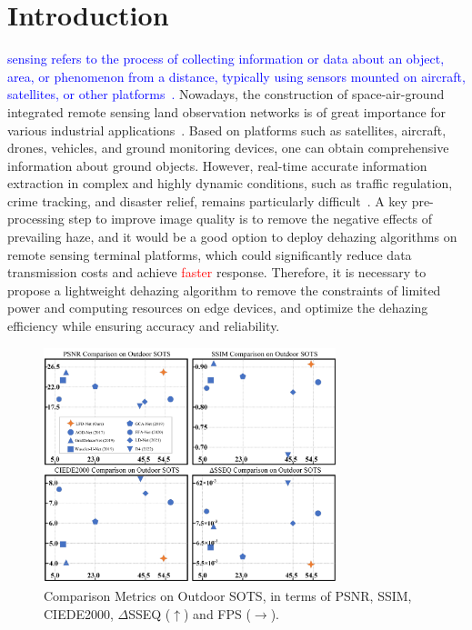 \documentclass[lettersize,journal]{IEEEtran}
\begin{document}
\section{Introduction}
 \textcolor{blue}{sensing refers to the process of collecting information or data about an object, area, or phenomenon from a distance, typically using sensors mounted on aircraft, satellites, or other platforms~\cite{lillesand2014remote}.} Nowadays, the construction of space-air-ground integrated remote sensing land observation networks is of great importance for various industrial applications~\cite{li2020nasa, tam2021adaptive}. Based on platforms such as satellites, aircraft, drones, vehicles, and ground monitoring devices, one can obtain comprehensive information about ground objects. However, real-time accurate information extraction in complex and highly dynamic conditions, such as traffic regulation, crime tracking, and disaster relief, remains particularly difficult~\cite{zheng2022dehaze, han2021edge, makarau2014haze}. A key pre-processing step to improve image quality is to remove the negative effects of prevailing haze, and it would be a good option to deploy dehazing algorithms on remote sensing terminal platforms, which could significantly reduce data transmission costs and achieve \textcolor{red}{faster} response. Therefore, it is necessary to propose a lightweight dehazing algorithm to remove the constraints of limited power and computing resources on edge devices, and optimize the dehazing efficiency while ensuring accuracy and reliability.

\begin{figure}[t]
    \centering
    \includegraphics[width=8.5cm]{sample.png}
    \caption{Comparison Metrics on Outdoor SOTS, in terms of PSNR, SSIM, CIEDE2000, $\Delta$SSEQ ($\uparrow$) and FPS ($\rightarrow$).}
    \label{sample}
\end{figure}
\end{document}

